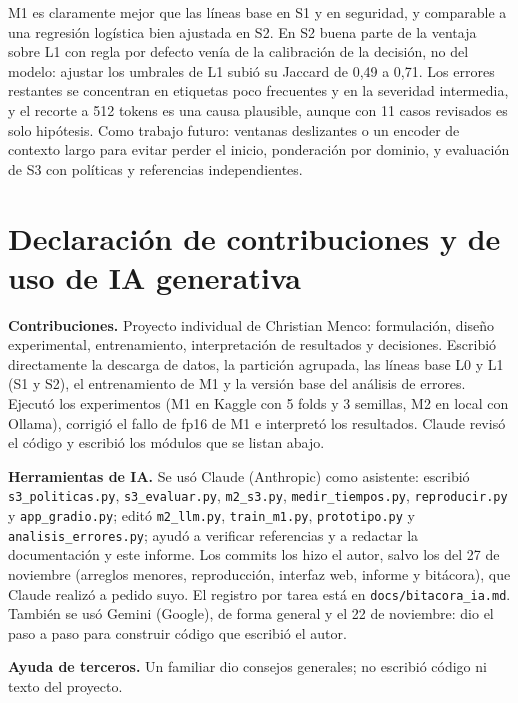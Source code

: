 \documentclass[conference]{IEEEtran}
\begin{document}
M1 es claramente mejor que las líneas base en S1 y en seguridad, y comparable a una regresión logística bien ajustada en S2. En S2 buena parte de la ventaja sobre L1 con regla por defecto venía de la calibración de la decisión, no del modelo: ajustar los umbrales de L1 subió su Jaccard de 0,49 a 0,71. Los errores restantes se concentran en etiquetas poco frecuentes y en la severidad intermedia, y el recorte a 512 tokens es una causa plausible, aunque con 11 casos revisados es solo hipótesis. Como trabajo futuro: ventanas deslizantes o un encoder de contexto largo para evitar perder el inicio, ponderación por dominio, y evaluación de S3 con políticas y referencias independientes.

\section{Declaración de contribuciones y de uso de IA generativa}\label{sec:ia}
\textbf{Contribuciones.} Proyecto individual de Christian Menco: formulación, diseño experimental, entrenamiento, interpretación de resultados y decisiones. Escribió directamente la descarga de datos, la partición agrupada, las líneas base L0 y L1 (S1 y S2), el entrenamiento de M1 y la versión base del análisis de errores. Ejecutó los experimentos (M1 en Kaggle con 5 folds y 3 semillas, M2 en local con Ollama), corrigió el fallo de fp16 de M1 e interpretó los resultados. Claude revisó el código y escribió los módulos que se listan abajo.

\textbf{Herramientas de IA.} Se usó Claude (Anthropic) como asistente: escribió \texttt{s3\_politicas.py}, \texttt{s3\_evaluar.py}, \texttt{m2\_s3.py}, \texttt{medir\_tiempos.py}, \texttt{reproducir.py} y \texttt{app\_gradio.py}; editó \texttt{m2\_llm.py}, \texttt{train\_m1.py}, \texttt{prototipo.py} y \texttt{analisis\_errores.py}; ayudó a verificar referencias y a redactar la documentación y este informe. Los commits los hizo el autor, salvo los del 27 de noviembre (arreglos menores, reproducción, interfaz web, informe y bitácora), que Claude realizó a pedido suyo. El registro por tarea está en \texttt{docs/bitacora\_ia.md}. También se usó Gemini (Google), de forma general y el 22 de noviembre: dio el paso a paso para construir código que escribió el autor.

\textbf{Ayuda de terceros.} Un familiar dio consejos generales; no escribió código ni texto del proyecto.
\end{document}
